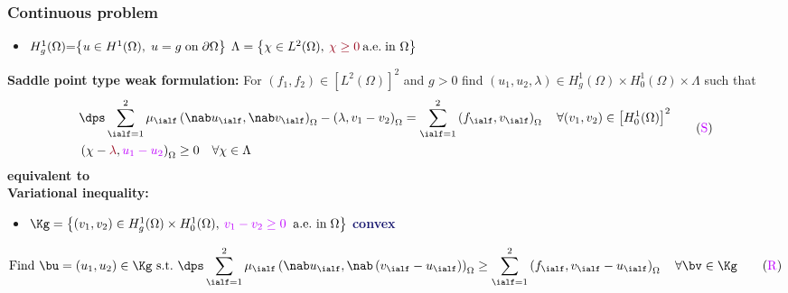 \begin{frame}
\frametitle{Continuous problem}
\begin{itemize}
\item $H_g^1(\Omega)\hspace{-0.1 cm} =\hspace{-0.1 cm} \left\{u\in H^1(\Omega), \hspace{0.1 cm} u=g \hspace{0.1 cm} \mbox{on} \hspace{0.1 cm} \partial \Omega\right\}$ \quad $\Lambda=\left\{\chi\in L^2(\Omega), \: \textcolor{carmine}{\chi \geq 0} \: \mbox{a.e.} \hspace{0.1 cm} \mbox{in} \ \Omega\right\}$
\end{itemize}
\textbf{Saddle point type weak formulation:}
For $(f_1,f_2)\in \left[L^2(\Omega)\right]^2$ and $g > 0$ find $(u_1,u_2,\lambda)\in H_g^1(\Omega)\times H_0^1(\Omega) \times \Lambda$ such that
\begin{equation*}
\begin{split}
& \dps \sum_{\ialf=1}^2 \mu_\ialf \left(\nab u_\ialf,\nab v_\ialf\right)_{\Omega} - \left(\lambda,v_1-v_2\right)_{\Omega} = \sum_{\ialf=1}^2\left(f_\ialf,v_\ialf\right)_{\Omega} \quad \forall (v_1,v_2) \in \left[H_0^1(\Omega)\right]^2 \\
& \left(\chi - \textcolor{carmine}{\lambda},\textcolor{electricpurple}{u_1-u_2}\right)_{\Omega} \geq 0 
\quad \forall \chi \in \Lambda 
\end{split}
 \tag{$\textcolor{electricpurple}{\mathrm{S}}$}
\end{equation*}
\hspace{4.5 cm}\textcolor{cadmiumgreen}{\textbf{equivalent to}}\\
\textbf{Variational inequality:}
\begin{itemize}
\item $\Kg= \left\{(v_1,v_2)\in H_g^1(\Omega)\times H_0^1(\Omega),\: \textcolor{electricpurple}{v_1-v_2 \geq 0} \; \; \mbox{a.e.} \ \mbox{in} 
\hspace{0.1 cm} \Omega \right\}$ \textcolor{midnightblue}{\textbf{convex}}
\end{itemize}
\begin{equation*}
\mbox{Find} \ \bu=\left(u_1,u_2\right) \in \Kg \ \mbox{s.t.} \ \dps \sum_{\ialf=1}^2 \mu_\ialf \left(\nab u_\ialf,\nab \left(v_\ialf-u_\ialf\right)\right)_{\Omega} \geq \sum_{\ialf=1}^2\left(f_\ialf,v_\ialf-u_\ialf\right)_{\Omega} \quad \forall \bv \in \Kg  \tag{$\textcolor{electricpurple}{\mathrm{R}}$}
\end{equation*}
\end{frame}
